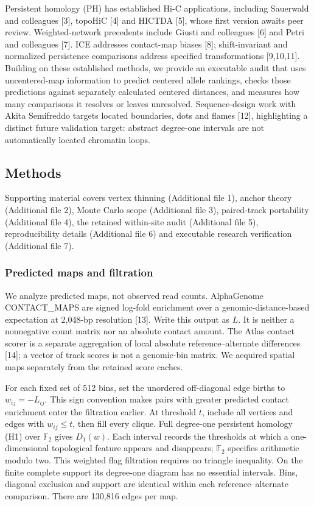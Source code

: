 \documentclass[
  11pt,
]{article}
\begin{document}
Persistent homology (PH) has established Hi-C applications, including
Sauerwald and colleagues {[}3{]}, topoHiC {[}4{]} and HICTDA {[}5{]},
whose first version awaits peer review. Weighted-network precedents
include Giusti and colleagues {[}6{]} and Petri and colleagues {[}7{]}.
ICE addresses contact-map biases {[}8{]}; shift-invariant and normalized
persistence comparisons address specified transformations {[}9,10,11{]}.
Building on these established methods, we provide an executable audit
that uses uncentered-map information to predict centered allele
rankings, checks those predictions against separately calculated
centered distances, and measures how many comparisons it resolves or
leaves unresolved. Sequence-design work with Akita Semifreddo targets
located boundaries, dots and flames {[}12{]}, highlighting a distinct
future validation target: abstract degree-one intervals are not
automatically located chromatin loops.

\subsection{Methods}\label{methods}

Supporting material covers vertex thinning (Additional file 1), anchor
theory (Additional file 2), Monte Carlo scope (Additional file 3),
paired-track portability (Additional file 4), the retained within-site
audit (Additional file 5), reproducibility details (Additional file 6)
and executable research verification (Additional file 7).

\subsubsection{Predicted maps and
filtration}\label{predicted-maps-and-filtration}

We analyze predicted maps, not observed read counts. AlphaGenome
CONTACT\_MAPS are signed log-fold enrichment over a
genomic-distance-based expectation at 2,048-bp resolution {[}13{]}.
Write this output as \(L\). It is neither a nonnegative count matrix nor
an absolute contact amount. The Atlas contact scorer is a separate
aggregation of local absolute reference--alternate differences {[}14{]};
a vector of track scores is not a genomic-bin matrix. We acquired
spatial maps separately from the retained score caches.

For each fixed set of 512 bins, set the unordered off-diagonal edge
births to \(w_{ij}=-L_{ij}\). This sign convention makes pairs with
greater predicted contact enrichment enter the filtration earlier. At
threshold \(t\), include all vertices and edges with \(w_{ij}\leq t\),
then fill every clique. Full degree-one persistent homology (H1) over
\(\mathbb F_2\) gives \(D_1(w)\). Each interval records the thresholds
at which a one-dimensional topological feature appears and disappears;
\(\mathbb F_2\) specifies arithmetic modulo two. This weighted flag
filtration requires no triangle inequality. On the finite complete
support its degree-one diagram has no essential intervals. Bins,
diagonal exclusion and support are identical within each
reference--alternate comparison. There are 130,816 edges per map.
\end{document}
